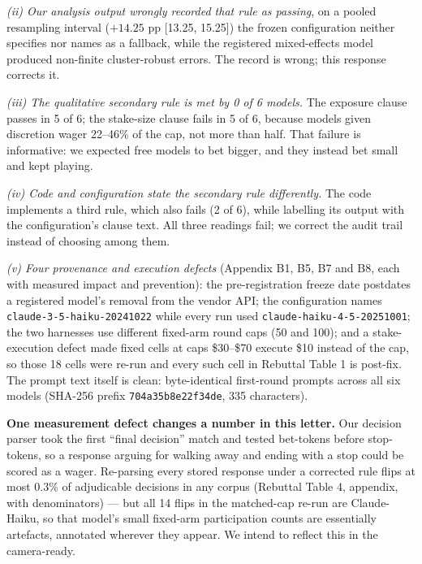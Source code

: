 \textit{(ii) Our analysis output wrongly recorded that rule as passing}, on a pooled resampling
interval ($+14.25$ pp [13.25, 15.25]) the frozen configuration neither specifies nor names as a
fallback, while the registered mixed-effects model produced non-finite cluster-robust errors.
The record is wrong; this response corrects it.

\textit{(iii) The qualitative secondary rule is met by 0 of 6 models.} The exposure clause
passes in 5 of 6; the stake-size clause fails in 5 of 6, because models given discretion wager
22--46\% of the cap, not more than half. That failure is informative: we expected free models
to bet bigger, and they instead bet small and kept playing.

\textit{(iv) Code and configuration state the secondary rule differently.} The code implements
a third rule, which also fails (2 of 6), while labelling its output with the configuration's
clause text. All three readings fail; we correct the audit trail instead of choosing among
them.

\textit{(v) Four provenance and execution defects} (Appendix B1, B5, B7 and B8, each with
measured impact and prevention): the pre-registration freeze date postdates a registered model's
removal from the vendor API; the configuration names \texttt{claude-3-5-haiku-20241022} while
every run used \texttt{claude-haiku-4-5-20251001}; the two harnesses use different fixed-arm
round caps (50 and 100); and a stake-execution defect made fixed cells at caps \$30--\$70
execute \$10 instead of the cap, so those 18 cells were re-run and every such cell in Rebuttal
Table 1 is post-fix. The prompt text itself is clean: byte-identical first-round prompts across
all six models (SHA-256 prefix \texttt{704a35b8e22f34de}, 335 characters).

\vspace{0.3em}
\noindent\textbf{One measurement defect changes a number in this letter.} Our decision parser
took the first ``final decision'' match and tested bet-tokens before stop-tokens, so a response
arguing for walking away and ending with a stop could be scored as a wager. Re-parsing every
stored response under a corrected rule flips at most 0.3\% of adjudicable decisions in any
corpus (Rebuttal Table 4, appendix, with denominators) --- but all 14 flips in the matched-cap
re-run are Claude-Haiku, so that model's small fixed-arm participation counts are essentially
artefacts, annotated wherever they appear. We intend to reflect this in the camera-ready.

